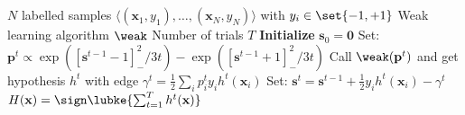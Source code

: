 \newpage
\section{\adaN}
\label{app:adaN}
\begin{algorithm} 
\caption{\adaN}
\begin{algorithmic}[1]
\Require 
\Statex $N$ labelled samples $\langle (\mathbf x_1,y_1),\ldots,(\mathbf x_N,y_N)\rangle$ with $y_i\in\set{-1,+1}$
\Statex Weak learning algorithm $\weak$
\Statex Number of trials $T$
\Procedure{\adaN}{}
\State \textbf{Initialize} $\mathbf{s}_0 = \mathbf 0$
\State Set: $\mathbf p^t \propto \exp([\mathbf s^{t-1}-1]_-^2/3t) - \exp([\mathbf s^{t-1}+1]_-^2/3t) $ 
\State Call $\weak(\mathbf p^t)$ and get hypothesis $h^t$ with edge $\gamma^t = \frac12\sum_ip^t_iy_ih^t(\mathbf x_i)$
\State Set: $\mathbf s^t = \mathbf s^{t-1} + \frac12 y_ih^t(\mathbf x_i)-\gamma^t$
\EndFor\\
\Return $H(\mathbf x) = \sign\lubke{\sum^T_{t=1}h^t(\mathbf{x})}$
\EndProcedure
\end{algorithmic}
\end{algorithm}